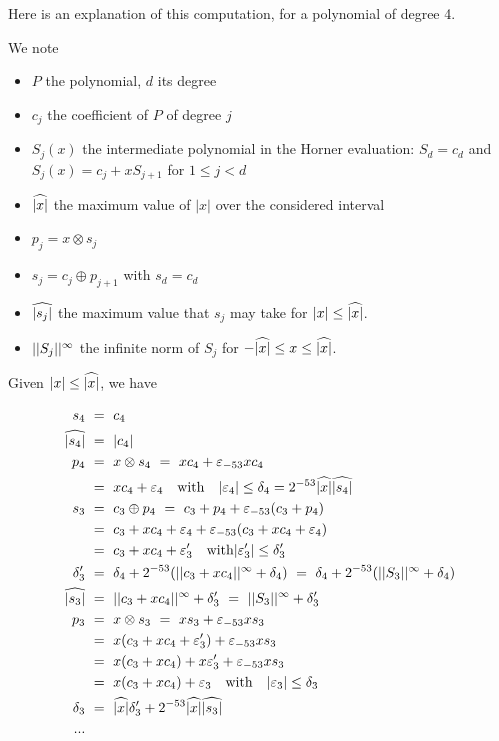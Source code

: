 Here is an explanation of this computation, for a polynomial of degree 4.





 We note 
\begin{itemize}
\item $P$ the polynomial, $d$ its degree
\item $c_j$ the coefficient of $P$ of degree $j$
\item $S_j(x)$ the intermediate polynomial in the Horner evaluation:
  $S_d=c_d$ and $S_j(x) = c_j+xS_{j+1}$ for $1\le j <d$
\item ${\widehat{|x|}}$ the maximum value of $|x|$ over the considered interval
\item $p_j = x \otimes s_j $ 
\item $s_j =   c_j \oplus p_{j+1}$ with $s_d = c_d$ 
\item $\widehat{|s_{j}|}$ the  maximum value that $s_j$ may take for $|x|
  \le {\widehat{|x|}}$.
\item $||{S_j}||^{\infty}$ the infinite norm of $S_j$ for $-{\widehat{|x|}} \le
  x\le {\widehat{|x|}}$.
\end{itemize}

Given $ |x| \leq {\widehat{|x|}}$, we have

\begin{align*}
  s_4 & \ = \ c_4\\
  \widehat{|s_{4}|} & \ = \  |c_4|\\
  p_4 & \ = \  x \otimes s_4 \ = \  x c_4 + \varepsilon_{-53} x c_4 \\
      & \ = \  xc_4 + \varepsilon_4 \quad \mathrm{with} \quad |\varepsilon_4| \le \delta_4 = 2^{-53}{\widehat{|x|}} \widehat{|s_{4}|}\\
  s_3 & \ = \  c_3 \oplus p_4 \ = \  c_3 + p_4 + \varepsilon_{-53}(c_3 + p_4) \\
      & \ = \  c_3 +  xc_4 + \varepsilon_4 + \varepsilon_{-53}(c_3 + xc_4 + \varepsilon_4) \\
      & \ = \  c_3 +  xc_4 + \varepsilon'_3  
      \quad \mathrm{with} |\varepsilon'_3| \le \delta'_3\\
  \delta'_3 & \ =\  \delta_4 + 2^{-53}(||{c_3 + xc_4}||^{\infty} + \delta_4)\  =\  \delta_4 + 2^{-53}(||{S_3}||^{\infty} + \delta_4)\\
  \widehat{|s_{3}|} & \ = \  ||{c_3 + xc_4}||^{\infty} + \delta'_3 \ = \  ||{S_3}||^{\infty} + \delta'_3\\ 
  p_3 & \ = \  x \otimes s_3 \ = \  x s_3 + \varepsilon_{-53} x s_3 \\
      & \ = \  x(c_3 +  xc_4 + \varepsilon'_3) + \varepsilon_{-53} x s_3\\
      & \ = \  x(c_3 +  xc_4) + x\varepsilon'_3 + \varepsilon_{-53} x s_3\\
      & \ = \  x(c_3 +  xc_4) +  \varepsilon_3 \quad \mathrm{with} \quad 
      |\varepsilon_3| \le \delta_3\\
  \delta_3 & \ =\ {\widehat{|x|}}\delta'_3 + 2^{-53} {\widehat{|x|}} \widehat{|s_{3}|}\\
...
\end{align*}


